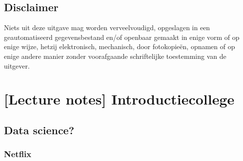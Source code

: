 \documentclass[]{tufte-book}
\begin{document}
\hypertarget{disclaimer}{%
\section*{Disclaimer}\label{disclaimer}}

Niets uit deze uitgave mag worden verveelvoudigd, opgeslagen in een geautomatiseerd gegevensbestand en/of openbaar gemaakt in enige vorm of op enige wijze, hetzij elektronisch, mechanisch, door fotokopieën, opnamen of op enige andere manier zonder voorafgaande schriftelijke toestemming van de uitgever.

\hypertarget{lecture-notes-introductiecollege}{%
\chapter{{[}Lecture notes{]} Introductiecollege}\label{lecture-notes-introductiecollege}}

\hypertarget{data-science}{%
\section{Data science?}\label{data-science}}

\hypertarget{netflix}{%
\subsection{Netflix}\label{netflix}}
\end{document}

